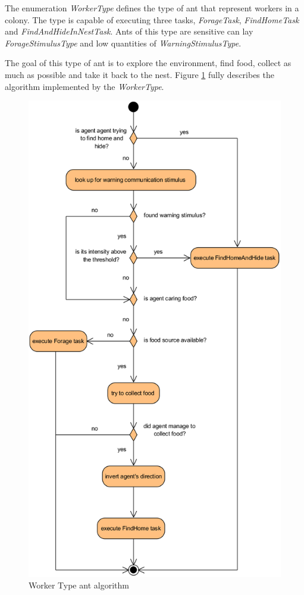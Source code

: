 The enumeration \emph{WorkerType} defines the type of ant that represent workers in a colony. The type is capable of executing three tasks, \emph{ForageTask}, \emph{FindHomeTask} and \emph{FindAndHideInNestTask}. Ants of this type are sensitive can lay \emph{ForageStimulusType} and low quantities of \emph{WarningStimulusType}. 

The goal of this type of ant is to explore the environment, find food,  collect as much as possible and take it back to the nest. Figure \ref{fig:worker-type} fully describes the algorithm implemented by the \emph{WorkerType}.

\begin{figure}[H]
  \centering
  \includegraphics[width=0.8\linewidth]{gfx/uml-worker-type.png}
  \caption{Worker Type ant algorithm}
  \label{fig:worker-type}
\end{figure}

